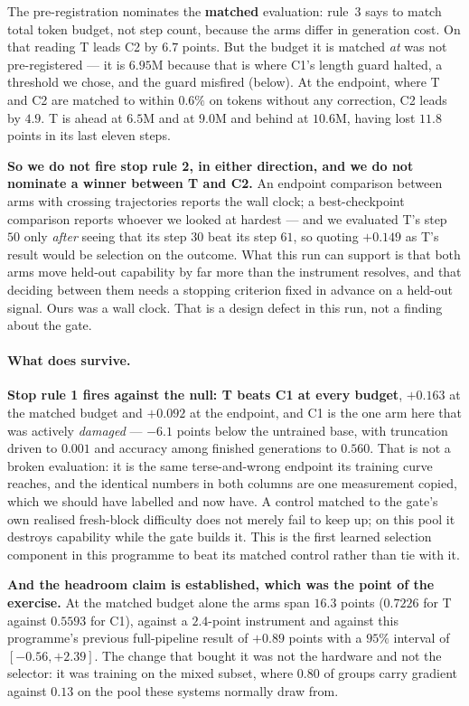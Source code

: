 The pre-registration nominates the \textbf{matched} evaluation: rule~3 says to match total
token budget, not step count, because the arms differ in generation cost. On that reading T
leads C2 by $6.7$ points. But the budget it is matched \emph{at} was not pre-registered --- it
is $6.95$M because that is where C1's length guard halted, a threshold we chose, and the guard
misfired (below). At the endpoint, where T and C2 are matched to within $0.6\%$ on tokens
without any correction, C2 leads by $4.9$. T is ahead at $6.5$M and at $9.0$M and behind at
$10.6$M, having lost $11.8$ points in its last eleven steps.

\textbf{So we do not fire stop rule 2, in either direction, and we do not nominate a winner
between T and C2.} An endpoint comparison between arms with crossing trajectories reports the
wall clock; a best-checkpoint comparison reports whoever we looked at hardest --- and we
evaluated T's step $50$ only \emph{after} seeing that its step $30$ beat its step $61$, so
quoting $+0.149$ as T's result would be selection on the outcome. What this run can support is
that both arms move held-out capability by far more than the instrument resolves, and that
deciding between them needs a stopping criterion fixed in advance on a held-out signal. Ours
was a wall clock. That is a design defect in this run, not a finding about the gate.

\paragraph{What does survive.}
\textbf{Stop rule 1 fires against the null: T beats C1 at every budget}, $+0.163$ at the
matched budget and $+0.092$ at the endpoint, and C1 is the one arm here that was actively
\emph{damaged} --- $-6.1$ points below the untrained base, with truncation driven to $0.001$
and accuracy among finished generations to $0.560$. That is not a broken evaluation: it is the
same terse-and-wrong endpoint its training curve reaches, and the identical numbers in both
columns are one measurement copied, which we should have labelled and now have. A control
matched to the gate's own realised fresh-block difficulty does not merely fail to keep up; on
this pool it destroys capability while the gate builds it. This is the first learned selection
component in this programme to beat its matched control rather than tie with it.

\textbf{And the headroom claim is established, which was the point of the exercise.} At the
matched budget alone the arms span $\mathbf{16.3}$ points ($0.7226$ for T against $0.5593$ for
C1), against a $2.4$-point instrument and against this programme's previous full-pipeline result of $+0.89$
points with a $95\%$ interval of $[-0.56,+2.39]$. The change that bought it was not the
hardware and not the selector: it was training on the mixed subset, where $0.80$ of groups
carry gradient against $0.13$ on the pool these systems normally draw from.

